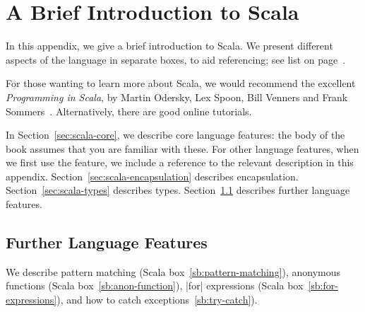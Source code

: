 
\renewcommand{\textfraction}{.1}
\renewcommand{\topfraction}{.9}
\renewcommand{\floatpagefraction}{.75} %
\renewcommand{\bottomfraction}{0.9}
\def\floatsep{\medskipamount} %
\def\intextsep{\medskipamount} %
\def\textfloatsep{\medskipamount} %
\setcounter{topnumber}{2}

\chapter{A Brief Introduction to Scala}
\label{app:scala}

In this appendix, we give a brief introduction to Scala.  We present different
aspects of the language in separate boxes, to aid referencing; see list on
page~\pageref{listofsib}.

For those wanting to learn more about Scala, we would recommend the excellent
\emph{Programming in Scala}, by Martin Odersky, Lex Spoon, Bill Venners and
Frank Sommers~\cite{odersky+}.  Alternatively, there are good online tutorials.

In Section~\ref{sec:scala-core}, we describe core language features: the body
of the book assumes that you are familiar with these.  For other language
features, when we first use the feature, we include a reference to the
relevant description in this appendix.  Section~\ref{sec:scala-encapsulation}
describes encapsulation.  Section~\ref{sec:scala-types} describes types.
Section~\ref{sec:scala-misc} describes further language features.










\pagebreak[3]

\section{Further Language Features}
\label{sec:scala-misc}

We describe pattern matching (Scala box~\ref{sb:pattern-matching}), anonymous
functions (Scala box~\ref{sb:anon-function}), |for| expressions (Scala
box~\ref{sb:for-expressions}), and how to catch
exceptions~\ref{sb:try-catch}). 

